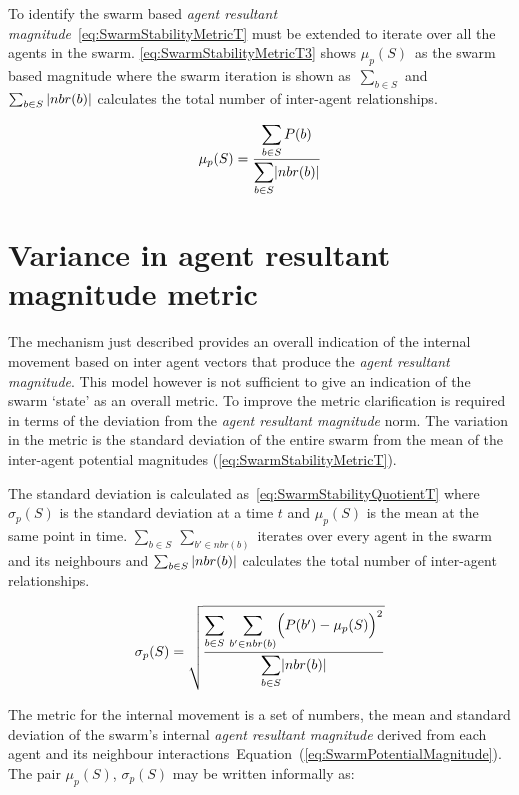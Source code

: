 To identify the swarm based \textit{agent resultant magnitude}~\autoref{eq:SwarmStabilityMetricT} must be extended to iterate over all the agents in the swarm. \autoref{eq:SwarmStabilityMetricT3} shows $\mu_p(S)$~as the swarm based magnitude where the swarm iteration is shown as~$\sum_{b \in S}$ and $\sum_{b \in S}\vert{nbr(b)}\vert$ calculates the total number of inter-agent relationships.

\begin{equation}
\label{eq:SwarmStabilityMetricT3}
\mu_p(S) = \frac{\mathlarger{\sum_{b \in S} P(b)}}{\mathlarger{\sum_{b \in S}}\card{nbr(b)}}
\end{equation}

\section{Variance in agent resultant magnitude metric}\label{Section:VarianceInPotential}
The mechanism just described provides an overall indication of the internal movement based on inter agent vectors that produce the \textit{agent resultant magnitude}. This model however is not sufficient to give an indication of the swarm `state' as an overall metric. To improve the metric clarification is required in terms of the deviation from the \textit{agent resultant magnitude} norm. The variation in the metric is the standard deviation of the entire swarm from the mean of the inter-agent potential magnitudes (\autoref{eq:SwarmStabilityMetricT}).

The standard deviation is calculated as~\autoref{eq:SwarmStabilityQuotientT} where $\sigma_p(S)$ is the standard deviation at a time $t$ and $\mu_p(S)$ is the mean at the same point in time. $\sum_{b \in S}~\sum_{b' \in nbr(b)}$ iterates over every agent in the swarm and its neighbours and $\sum_{b \in S}\vert{nbr(b)}\vert$ calculates the total number of inter-agent relationships.

\begin{equation}
\label{eq:SwarmStabilityQuotientT}
\sigma_p(S) = \sqrt{\frac{\mathlarger{\sum_{b \in S}}~\mathlarger{\sum_{b' \in nbr(b)}}\Big(P(b')-\mu_p(S)\Big)^2}{\mathlarger{\sum_{b \in S}}\card{nbr(b)}}}
\end{equation}

The metric for the internal movement is a set of numbers, the mean and standard deviation of the swarm's internal \textit{agent resultant magnitude} derived from each agent and its neighbour interactions~Equation~(\ref{eq:SwarmPotentialMagnitude}). The pair $\mu_p(S)$, $\sigma_p(S)$ may be written informally as: 

